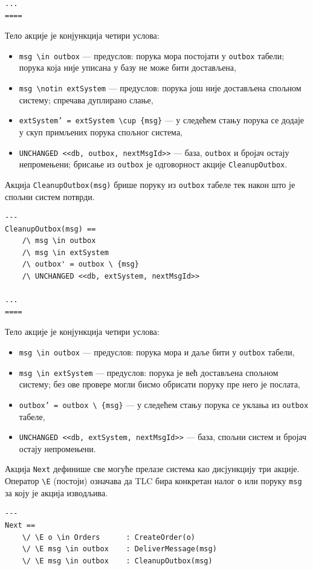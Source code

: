 \begin{primer}
\begin{lstlisting}
...
====
\end{lstlisting}
Тело акције је конјункција четири услова:
\begin{itemize}
    \item \texttt{msg \textbackslash in outbox} --- предуслов: порука мора постојати у \texttt{outbox} табели; порука која није уписана у базу не може бити достављена,
    \item \texttt{msg \textbackslash notin extSystem} --- предуслов: порука још није достављена спољном систему; спречава дуплирано слање,
    \item \texttt{extSystem' = extSystem \textbackslash cup \{msg\}} --- у следећем стању порука се додаје у скуп примљених порука спољног система,
    \item \texttt{UNCHANGED <<db, outbox, nextMsgId>>} --- база, \texttt{outbox} и бројач остају непромењени; брисање из \texttt{outbox} је одговорност акције \texttt{CleanupOutbox}.
\end{itemize}

Акција \texttt{CleanupOutbox(msg)} брише поруку из \texttt{outbox} табеле тек након што је спољни систем потврди.
\begin{lstlisting}
---
CleanupOutbox(msg) ==
    /\ msg \in outbox
    /\ msg \in extSystem
    /\ outbox' = outbox \ {msg}
    /\ UNCHANGED <<db, extSystem, nextMsgId>>

...
====
\end{lstlisting}
Тело акције је конјункција четири услова:
\begin{itemize}
    \item \texttt{msg \textbackslash in outbox} --- предуслов: порука мора и даље бити у \texttt{outbox} табели,
    \item \texttt{msg \textbackslash in extSystem} --- предуслов: порука је већ достављена спољном систему; без ове провере могли бисмо обрисати поруку пре него је послата,
    \item \texttt{outbox' = outbox \textbackslash\ \{msg\}} --- у следећем стању порука се уклања из \texttt{outbox} табеле,
    \item \texttt{UNCHANGED <<db, extSystem, nextMsgId>>} --- база, спољни систем и бројач остају непромењени.
\end{itemize}

Акција \texttt{Next} дефинише све могуће прелазе система као дисјункцију три акције.
Оператор \texttt{\textbackslash E} (постоји) означава да TLC бира конкретан налог \texttt{o} или поруку \texttt{msg} за коју је акција изводљива.
\begin{lstlisting}
---
Next ==
    \/ \E o \in Orders      : CreateOrder(o)
    \/ \E msg \in outbox    : DeliverMessage(msg)
    \/ \E msg \in outbox    : CleanupOutbox(msg)


\end{lstlisting}
\end{primer}
